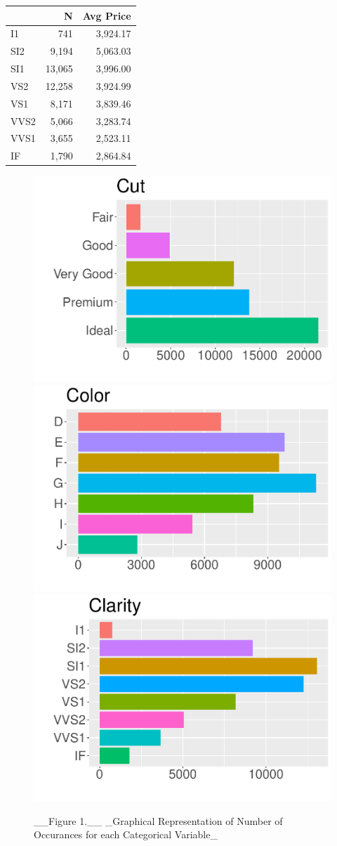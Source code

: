 \documentclass[
]{article}
\begin{document}
\begin{table}
\begin{table}
\centering
\begin{tabular}[t]{lrr}
\toprule
 & N & Avg Price\\
\midrule
I1 & 741 & 3,924.17\\
SI2 & 9,194 & 5,063.03\\
SI1 & 13,065 & 3,996.00\\
VS2 & 12,258 & 3,924.99\\
VS1 & 8,171 & 3,839.46\\
\addlinespace
VVS2 & 5,066 & 3,283.74\\
VVS1 & 3,655 & 2,523.11\\
IF & 1,790 & 2,864.84\\
\bottomrule
\end{tabular}
\end{table}
\end{table}

\hfill\break

\begin{figure}

{\centering \includegraphics[width=0.333\linewidth]{diamonds_files/figure-latex/show categorical figures-1} \includegraphics[width=0.333\linewidth]{diamonds_files/figure-latex/show categorical figures-2} \includegraphics[width=0.333\linewidth]{diamonds_files/figure-latex/show categorical figures-3} 

}

\caption{__Figure 1.__ _Graphical Representation of Number of Occurances for each Categorical Variable_}\label{fig:show categorical figures}
\end{figure}
\end{document}
